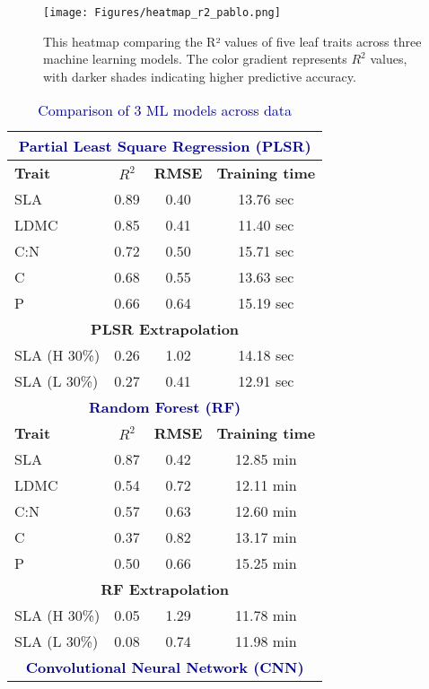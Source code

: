 \documentclass[12pt,a4paper]{report}
\begin{document}
\begin{figure}[h]
    \centering
    \texttt{[image: Figures/heatmap\_r2\_pablo.png]}
    \caption{This heatmap comparing the R² values of five leaf traits across three machine learning models. The color gradient represents $R^2$ values, with darker shades indicating higher predictive accuracy.}
    \label{fig:heatmap_r2_pablo}
\end{figure}

\begin{table}[h!]
\centering
\caption{\textcolor{darkblue}{Comparison of 3 ML models across data}}
\label{tab:leaf-trait-analysis}
\begin{tabular}{lccc}
\toprule
\multicolumn{4}{c}{\textbf{\textcolor{darkblue}{Partial Least Square Regression (PLSR)}}} \\ 
\midrule
\textbf{Trait} & \textbf{$R^2$} & \textbf{RMSE} & \textbf{Training time} \\
\midrule
SLA  & 0.89 & 0.40 & 13.76 sec \\
LDMC & 0.85 & 0.41 & 11.40 sec \\
C:N  & 0.72 & 0.50 & 15.71 sec \\
C    & 0.68 & 0.55 & 13.63 sec \\
P    & 0.66 & 0.64 & 15.19 sec \\
\midrule
\multicolumn{4}{c}{\textbf{{PLSR Extrapolation}}} \\ 
\midrule
SLA (H 30\%) & 0.26 & 1.02 &  14.18 sec \\
SLA  (L 30\%)& 0.27 & 0.41 &  12.91 sec \\
\midrule
\multicolumn{4}{c}{\textbf{\textcolor{darkblue}{Random Forest (RF)}}} \\ 
\midrule
\textbf{Trait} & \textbf{$R^2$} & \textbf{RMSE} & \textbf{Training time} \\
\midrule
SLA  & 0.87 & 0.42 & 12.85 min \\
LDMC & 0.54 & 0.72 & 12.11 min \\
C:N  & 0.57 & 0.63 & 12.60 min \\
C    & 0.37 & 0.82 & 13.17 min \\
P    & 0.50 & 0.66 & 15.25 min \\
\midrule
\multicolumn{4}{c}{\textbf{{RF Extrapolation}}} \\ 
\midrule
SLA (H 30\%) & 0.05 & 1.29 &  11.78 min \\
SLA  (L 30\%)& 0.08 & 0.74 & 11.98 min \\
\midrule
\multicolumn{4}{c}{\textbf{\textcolor{darkblue}{Convolutional Neural Network (CNN)}}} \\

\end{tabular}
\end{table}
\end{document}
